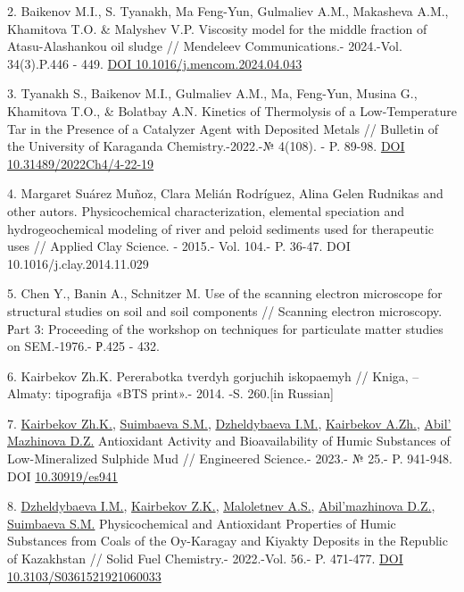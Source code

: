 2. Baikenov M.I., S. Tyanakh, Ma Feng-Yun, Gulmaliev A.M., Makasheva
A.M., Khamitova T.O. \& Malyshev V.P. Viscosity model for the middle
fraction of Atasu-Alashankou oil sludge // Mendeleev Communications.-
2024.-Vol. 34(3).P.446 - 449.
\href{https://doi.org/10.1016/j.mencom.2024.04.043}{DOI
10.1016/j.mencom.2024.04.043}

3. Tyanakh S., Baikenov M.I., Gulmaliev A.M., Ma, Feng-Yun, Musina G.,
Khamitova T.O., \& Bolatbay A.N\emph{.} Kinetics of Thermolysis of a
Low-Temperature Tar in the Presence of a Catalyzer Agent with Deposited
Metals // Bulletin of the University of Karaganda Chemistry.-2022.-№
4(108). - P. 89-98. \href{https://doi.org/10.31489/2022Ch4/4-22-19}{DOI
10.31489/2022Ch4/4-22-19}

4. Margaret Suárez Muñoz, Clara Melián Rodríguez, Alina Gelen Rudnikas
and other autors. Physicochemical characterization, elemental speciation
and hydrogeochemical modeling of river and peloid sediments used for
therapeutic uses // Applied Clay Science. - 2015.- Vol. 104.- P. 36-47.
DOI 10.1016/j.clay.2014.11.029

5. Chen Y., Banin A., Schnitzer M. Use of the scanning electron
microscope for structural studies on soil and soil components //
Scanning electron microscopy. Рart 3: Proceeding of the workshop on
techniques for particulate matter studies on SEM.-1976.- Р.425 - 432.

6. Kairbekov Zh.K. Pererabotka tverdyh gorjuchih iskopaemyh // Kniga, --
Almaty: tipografija «BTS print».- 2014. -S. 260.{[}in Russian{]}

7.
\href{https://www.scopus.com/authid/detail.uri?authorId=55910705200}{Kairbekov
Zh.K.},
\href{https://www.scopus.com/authid/detail.uri?authorId=57201691853}{Suimbaeva
S.M.},
\href{https://www.scopus.com/authid/detail.uri?authorId=56600659100}{Dzheldybaeva
I.M.},
\href{https://www.scopus.com/authid/detail.uri?authorId=56600640700}{Kairbekov
A.Zh.},
\href{https://www.scopus.com/authid/detail.uri?authorId=58021595400}{Abil' Mazhinova
D.Z.} Antioxidant Activity and Bioavailability of Humic Substances of
Low-Mineralized Sulphide Mud // Engineered Science.- 2023.- № 25.- P.
941-948. DOI \href{http://dx.doi.org/10.30919/es941}{10.30919/es941}

8.
\href{https://www.scopus.com/authid/detail.uri?authorId=56600659100}{Dzheldybaeva
I.M.},
\href{https://www.scopus.com/authid/detail.uri?authorId=55910705200}{Kairbekov
Z.K.},
\href{https://www.scopus.com/authid/detail.uri?authorId=7003481604}{Maloletnev
A.S.},
\href{https://www.scopus.com/authid/detail.uri?authorId=58021595400}{Abil'mazhinova
D.Z.},
\href{https://www.scopus.com/authid/detail.uri?authorId=57201691853}{Suimbaeva
S.M.} Physicochemical and Antioxidant Properties of Humic Substances
from Coals of the Oy-Karagay and Kiyakty Deposits in the Republic of
Kazakhstan // Solid Fuel Chemistry.- 2022.-Vol. 56.- P. 471-477.
\href{https://doi.org/10.3103/S0361521921060033}{DOI
10.3103/S0361521921060033}

